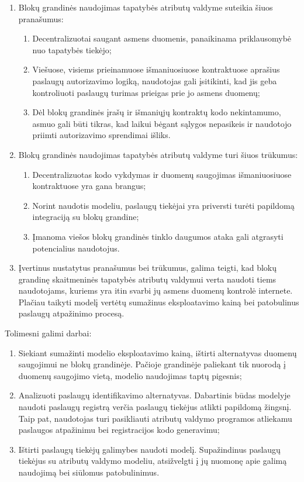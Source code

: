\renewcommand{\labelenumii}{\arabic{enumii}.}
\begin{enumerate}
    \item Blokų grandinės naudojimas tapatybės atributų valdyme suteikia šiuos pranašumus:
    \begin{enumerate}
        \item Decentralizuotai saugant asmens duomenis,
        panaikinama priklausomybė nuo tapatybės tiekėjo;
        \item Viešuose, visiems prieinamuose
        išmaniuosiuose kontraktuose aprašius paslaugų autorizavimo logiką, naudotojas gali įsitikinti,
        kad jis geba kontroliuoti paslaugų turimas prieigas prie jo asmens duomenų;
        \item Dėl blokų grandinės įrašų ir išmaniųjų kontraktų kodo
        nekintamumo, asmuo gali būti tikras, kad laikui bėgant sąlygos nepasikeis ir naudotojo priimti
        autorizavimo sprendimai išliks.
    \end{enumerate}
    \item Blokų grandinės naudojimas tapatybės atributų valdyme turi šiuos trūkumus:
    \begin{enumerate}
        \item Decentralizuotas kodo vykdymas ir duomenų saugojimas išmaniuosiuose kontraktuose yra gana brangus;
        \item Norint naudotis modeliu, paslaugų tiekėjai yra priversti turėti papildomą integraciją su blokų grandine;
        \item Įmanoma viešos blokų grandinės tinklo daugumos ataka gali atgrasyti potencialius naudotojus.
    \end{enumerate}
    \item Įvertinus nustatytus pranašumus bei trūkumus, galima teigti, kad blokų grandinę skaitmeninės tapatybės atributų valdymui verta naudoti
    tiems naudotojams, kuriems yra itin svarbi jų asmens duomenų kontrolė internete. Plačiau taikyti modelį vertėtų
    sumažinus eksploatavimo kainą bei patobulinus paslaugų atpažinimo procesą.
\end{enumerate}

\hfill \break
Tolimesni galimi darbai:

\begin{enumerate}
    \item Siekiant sumažinti modelio eksploatavimo kainą, ištirti alternatyvas duomenų saugojimui ne blokų grandinėje. Pačioje grandinėje
    paliekant tik nuorodą į duomenų saugojimo vietą, modelio naudojimas taptų pigesnis;
    \item Analizuoti paslaugų identifikavimo alternatyvas. Dabartinis būdas modelyje naudoti paslaugų registrą verčia paslaugų tiekėjus atlikti
    papildomą žingsnį. Taip pat, naudotojas turi pasikliauti atributų valdymo programos atliekamu paslaugos atpažinimu bei registracijos kodo generavimu;
    \item Ištirti paslaugų tiekėjų galimybes naudoti modelį. Supažindinus paslaugų tiekėjus su atributų valdymo modeliu,
    atsižvelgti į jų nuomonę apie galimą naudojimą bei siūlomus patobulinimus.
\end{enumerate}